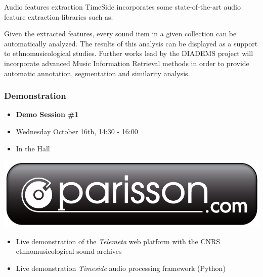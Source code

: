 \documentclass[final, hyperref, table]{beamer}
\begin{document}
\begin{frame}
 \begin{block}{Audio features extraction}
TimeSide incorporates some state-of-the-art audio feature extraction libraries such as:
\vspace{-0.1cm}
Given the extracted features, every sound item in a given collection can be automatically analyzed. The results of this analysis can be displayed as a support to ethnomusicological studies.
Further works lead by the DIADEMS project will incorporate advanced Music Information Retrieval methods in order to provide \alert{automatic annotation}, \alert{segmentation} and \alert{similarity} analysis.
    \end{block}
\end{frame}
\begin{frame}
  \frametitle{Demonstration}
 
  \begin{itemize}
  \item \textbf{Demo Session \#1}
  \item \alert{Wednesday} October 16th, 14:30 - 16:00
  \item In the Hall
  \end{itemize}
 \begin{center}
    \includegraphics[width=.3\linewidth]{../poster/img/parisson_logo_FINALE_com.pdf}
  \end{center}

  \begin{itemize}
  \item Live demonstration of the \emph{Telemeta} web platform with the CNRS ethnomusicological sound archives
  \item Live demonstration \emph{Timeside} audio processing framework (Python)
  \end{itemize}
\end{frame}
\end{document}
